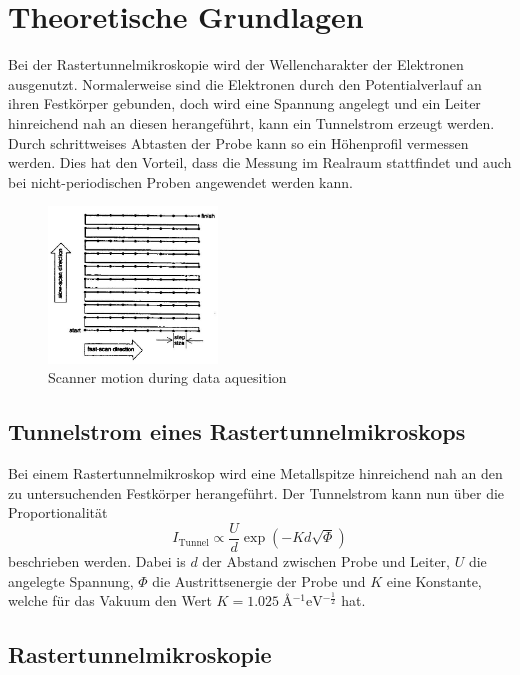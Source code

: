 \section{Theoretische Grundlagen}
\label{sec:theoretische_grundlagen}

Bei der Rastertunnelmikroskopie wird der Wellencharakter der Elektronen ausgenutzt.
Normalerweise sind die Elektronen durch den Potentialverlauf an ihren Festkörper gebunden, doch wird eine Spannung angelegt und ein Leiter hinreichend nah an diesen herangeführt, kann ein Tunnelstrom erzeugt werden.
Durch schrittweises Abtasten der Probe kann so ein Höhenprofil vermessen werden.
Dies hat den Vorteil, dass die Messung im Realraum stattfindet und auch bei nicht-periodischen Proben angewendet werden kann.
\begin{figure}[!h]
    \centering
    \includegraphics[width=0.4\textwidth]{images/scanning.jpg}
    \caption{Scanner motion during data aquesition \cite{STM-Literatur}}
\end{figure}

\subsection{Tunnelstrom eines Rastertunnelmikroskops} %
\label{sub:tunnelstrom}

Bei einem Rastertunnelmikroskop wird eine Metallspitze hinreichend nah an den zu untersuchenden Festkörper herangeführt.
Der Tunnelstrom kann nun über die Proportionalität
\begin{equation}
    I_\text{Tunnel} \propto \frac{U}{d} \exp{\left( - K d \sqrt{\Phi} \right)} \label{eqn:tunnelstrom}
\end{equation}
beschrieben werden.
Dabei is $d$ der Abstand zwischen Probe und Leiter, $U$ die angelegte Spannung, $\Phi$ die Austrittsenergie der Probe und $K$ eine Konstante, welche für das Vakuum den Wert $K = \SI{1,025}{\angstrom^{-1} \electronvolt^{-\frac{1}{2}}}$ hat.

\subsection{Rastertunnelmikroskopie} %
\label{sub:rastertunnelmikroskopie}

